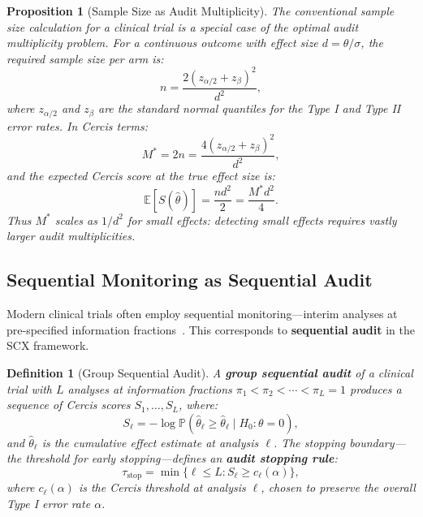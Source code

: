 \documentclass[12pt,a4paper]{article}
\newtheorem{proposition}[theorem]{Proposition}
\newtheorem{definition}[theorem]{Definition}
\theoremstyle{remark}
\newcommand{\E}{\mathbb{E}}
\newcommand{\Pbb}{\mathbb{P}}
\newcommand{\SCX}{\textsf{SCX}}
\newcommand{\Cercis}{\textsf{Cercis}}
\begin{document}
\begin{proposition}[Sample Size as Audit Multiplicity]
\label{prop:sample_size}
The conventional sample size calculation for a clinical trial is a special
case of the optimal audit multiplicity problem. For a continuous outcome
with effect size $d = \theta/\sigma$, the required sample size per arm
is:
\begin{equation}
  n = \frac{2(z_{\alpha/2} + z_{\beta})^2}{d^2},
\end{equation}
where $z_{\alpha/2}$ and $z_{\beta}$ are the standard normal quantiles for
the Type I and Type II error rates. In \Cercis{} terms:
\begin{equation}
  M^* = 2n = \frac{4(z_{\alpha/2} + z_{\beta})^2}{d^2},
\end{equation}
and the expected \Cercis{} score at the true effect size is:
\begin{equation}
  \E[S(\hat{\theta})] = \frac{n d^2}{2} =
  \frac{M^* d^2}{4}.
\end{equation}
Thus $M^*$ scales as $1/d^2$ for small effects: detecting small effects
requires vastly larger audit multiplicities.
\end{proposition}

\subsection{Sequential Monitoring as Sequential Audit}

Modern clinical trials often employ sequential monitoring---interim
analyses at pre-specified information fractions~\cite{jennison1999group}.
This corresponds to \textbf{sequential audit} in the \SCX{} framework.

\begin{definition}[Group Sequential Audit]
\label{def:sequential_audit}
A \textbf{group sequential audit} of a clinical trial with $L$ analyses
at information fractions $\pi_1 < \pi_2 < \cdots < \pi_L = 1$ produces
a sequence of \Cercis{} scores $S_1, \ldots, S_L$, where:
\begin{equation}
  S_{\ell} = -\log \Pbb(\hat{\theta}_{\ell} \geq \hat{\theta}_{\ell}
  \mid H_0: \theta = 0),
\end{equation}
and $\hat{\theta}_{\ell}$ is the cumulative effect estimate at analysis
$\ell$. The stopping boundary---the threshold for early stopping---defines
an \textbf{audit stopping rule}:
\begin{equation}
  \tau_{\text{stop}} = \min\{\ell \leq L : S_{\ell} \geq c_{\ell}(\alpha)\},
\end{equation}
where $c_{\ell}(\alpha)$ is the \Cercis{} threshold at analysis $\ell$,
chosen to preserve the overall Type I error rate $\alpha$.
\end{definition}
\end{document}
